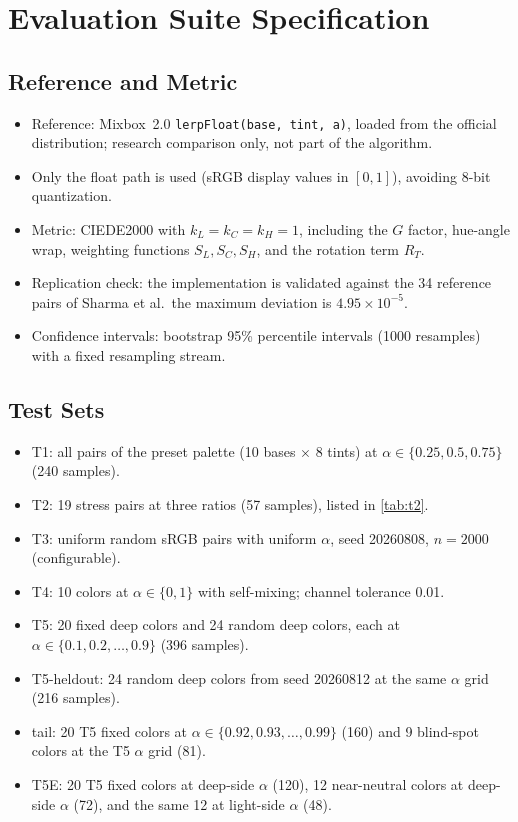 \appendix

\section{Evaluation Suite Specification}
\label{app:suite}

\subsection{Reference and Metric}
\begin{itemize}
\item Reference: Mixbox~2.0 \texttt{lerpFloat(base, tint, a)}, loaded from the official distribution; research comparison only, not part of the algorithm.
\item Only the float path is used (sRGB display values in $[0,1]$), avoiding 8-bit quantization.
\item Metric: CIEDE2000 with $k_{L}=k_{C}=k_{H}=1$, including the $G$ factor, hue-angle wrap, weighting functions $S_{L},S_{C},S_{H}$, and the rotation term $R_{T}$.
\item Replication check: the implementation is validated against the 34 reference pairs of Sharma et al.\ the maximum deviation is $4.95\times10^{-5}$.
\item Confidence intervals: bootstrap 95\% percentile intervals (1000 resamples) with a fixed resampling stream.
\end{itemize}

\subsection{Test Sets}
\begin{itemize}
\item T1: all pairs of the preset palette (10 bases $\times$ 8 tints) at $\alpha\in\{0.25,0.5,0.75\}$ (240 samples).
\item T2: 19 stress pairs at three ratios (57 samples), listed in \cref{tab:t2}.
\item T3: uniform random sRGB pairs with uniform $\alpha$, seed 20260808, $n=2000$ (configurable).
\item T4: 10 colors at $\alpha\in\{0,1\}$ with self-mixing; channel tolerance 0.01.
\item T5: 20 fixed deep colors and 24 random deep colors, each at $\alpha\in\{0.1,0.2,\dots,0.9\}$ (396 samples).
\item T5-heldout: 24 random deep colors from seed 20260812 at the same $\alpha$ grid (216 samples).
\item tail: 20 T5 fixed colors at $\alpha\in\{0.92,0.93,\dots,0.99\}$ (160) and 9 blind-spot colors at the T5 $\alpha$ grid (81).
\item T5E: 20 T5 fixed colors at deep-side $\alpha$ (120), 12 near-neutral colors at deep-side $\alpha$ (72), and the same 12 at light-side $\alpha$ (48).
\end{itemize}

